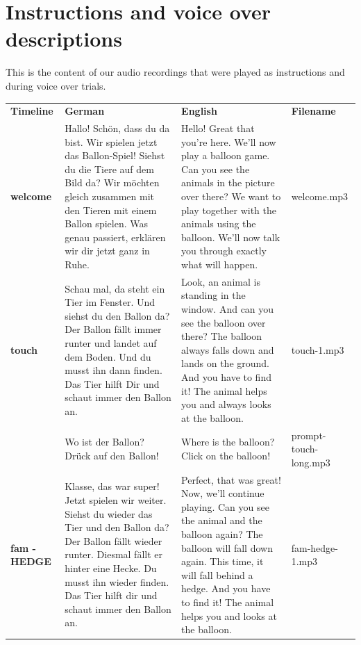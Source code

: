 \documentclass[
  man,floatsintext]{apa6}
\begin{document}
\hypertarget{instructions-and-voice-over-descriptions}{%
\section{Instructions and voice over descriptions}\label{instructions-and-voice-over-descriptions}}

This is the content of our audio recordings that were played as instructions and during voice over trials.

\begin{longtable}[]{@{}
  >{\raggedright\arraybackslash}p{}
  >{\raggedright\arraybackslash}p{}
  >{\raggedright\arraybackslash}p{}
  >{\raggedright\arraybackslash}p{}@{}}
\toprule
\endhead
\textbf{Timeline} & \textbf{German} & \textbf{English} & \textbf{Filename} \\
\textbf{welcome} & Hallo! Schön, dass du da bist. Wir spielen jetzt das Ballon-Spiel! Siehst du die Tiere auf dem Bild da? Wir möchten gleich zusammen mit den Tieren mit einem Ballon spielen. Was genau passiert, erklären wir dir jetzt ganz in Ruhe. & Hello! Great that you're here. We'll now play a balloon game. Can you see the animals in the picture over there? We want to play together with the animals using the balloon. We'll now talk you through exactly what will happen. & welcome.mp3 \\
\textbf{touch} & Schau mal, da steht ein Tier im Fenster. Und siehst du den Ballon da? Der Ballon fällt immer runter und landet auf dem Boden. Und du musst ihn dann finden. Das Tier hilft Dir und schaut immer den Ballon an. & Look, an animal is standing in the window. And can you see the balloon over there? The balloon always falls down and lands on the ground. And you have to find it! The animal helps you and always looks at the balloon. & touch-1.mp3 \\
& Wo ist der Ballon? Drück auf den Ballon! & Where is the balloon? Click on the balloon! & prompt-touch-long.mp3 \\
\textbf{fam - HEDGE} & Klasse, das war super! Jetzt spielen wir weiter. Siehst du wieder das Tier und den Ballon da? Der Ballon fällt wieder runter. Diesmal fällt er hinter eine Hecke. Du musst ihn wieder finden. Das Tier hilft dir und schaut immer den Ballon an. & Perfect, that was great! Now, we'll continue playing. Can you see the animal and the balloon again? The balloon will fall down again. This time, it will fall behind a hedge. And you have to find it! The animal helps you and looks at the balloon. & fam-hedge-1.mp3 \\

\end{longtable}
\end{document}
